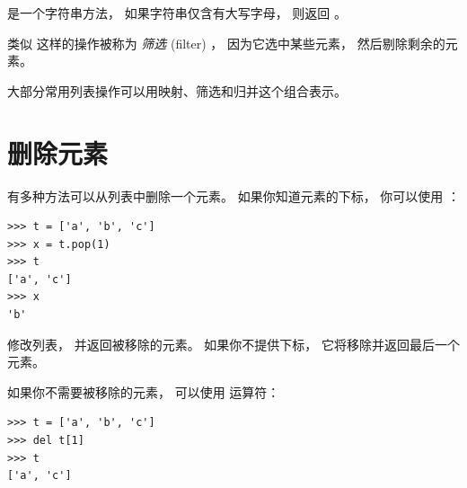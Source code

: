 %

 是一个字符串方法， 如果字符串仅含有大写字母， 则返回 。


类似  这样的操作被称为 {\em 筛选} (filter) ， 因为它选中某些元素， 然后剔除剩余的元素。


大部分常用列表操作可以用映射、筛选和归并这个组合表示。


\section{删除元素}
  


有多种方法可以从列表中删除一个元素。  如果你知道元素的下标， 你可以使用  ：

  

\begin{lstlisting}
>>> t = ['a', 'b', 'c']
>>> x = t.pop(1)
>>> t
['a', 'c']
>>> x
'b'
\end{lstlisting}

%

 修改列表， 并返回被移除的元素。  如果你不提供下标， 它将移除并返回最后一个元素。


如果你不需要被移除的元素， 可以使用  运算符：

  

\begin{lstlisting}
>>> t = ['a', 'b', 'c']
>>> del t[1]
>>> t
['a', 'c']
\end{lstlisting}

